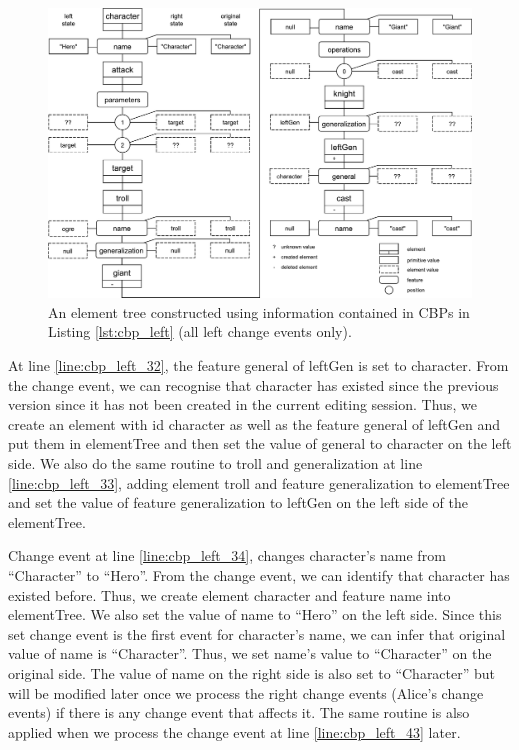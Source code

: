 \begin{figure}[ht]
\centering
\includegraphics[width=\linewidth]{element_tree_game_left}
\caption{An element tree constructed using information contained in CBPs in Listing \ref{lst:cbp_left} (all left change events only).}
\label{fig:left_element_tree_diagram}
\end{figure} 

At line \ref{line:cbp_left_32}, the feature \textsf{general} of \textsf{leftGen} is set to \textsf{character}. From the change event, we can recognise that \textsf{character} has existed since the previous version since it has not been created in the current editing session. Thus, we create an element with id \textsf{character} as well as the feature \textsf{general} of \textsf{leftGen} and put them in \textsf{elementTree} and then set the value of \textsf{general} to \textsf{character} on the left side. We also do the same routine to \textsf{troll} and \textsf{generalization} at line \ref{line:cbp_left_33}, adding element \textsf{troll} and feature \textsf{generalization} to \textsf{elementTree} and set the value of feature \textsf{generalization} to \textsf{leftGen} on the left side of the \textsf{elementTree}. 

Change event at line \ref{line:cbp_left_34}, changes \textsf{character}'s \textsf{name} from ``Character'' to ``Hero''. From the change event, we can identify that \textsf{character} has existed before. Thus, we create element \textsf{character} and feature \textsf{name} into \textsf{elementTree}. We also set the value of \textsf{name} to ``Hero'' on the left side. Since this set change event is the first event for \textsf{character}'s \textsf{name}, we can infer that original value of \textsf{name} is ``Character''. Thus, we set \textsf{name}'s value to ``Character'' on the original side. The value of \textsf{name} on the right side is also set to ``Character'' but will be modified later once we process the right change events (Alice's change events) if there is any change event that affects it. The same routine is also applied when we process the change event at line \ref{line:cbp_left_43} later.

